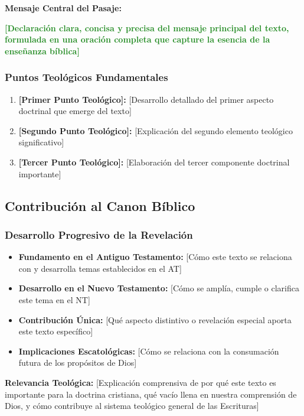 \documentclass[12pt,a4paper]{article}
\newcommand{\principio}[1]{\textcolor{forestgreen}{\textbf{#1}}}
\begin{document}
\begin{mdframed}[style=ImportantBox]
\textbf{Mensaje Central del Pasaje:}

\centering
\Large \principio{[Declaración clara, concisa y precisa del mensaje principal del texto, formulada en una oración completa que capture la esencia de la enseñanza bíblica]}
\end{mdframed}

\subsubsection{Puntos Teológicos Fundamentales}

\begin{enumerate}[leftmargin=*]
    \item \textbf{[Primer Punto Teológico]:} [Desarrollo detallado del primer aspecto doctrinal que emerge del texto]
    \item \textbf{[Segundo Punto Teológico]:} [Explicación del segundo elemento teológico significativo]
    \item \textbf{[Tercer Punto Teológico]:} [Elaboración del tercer componente doctrinal importante]
\end{enumerate}

\subsection{Contribución al Canon Bíblico}

\subsubsection{Desarrollo Progresivo de la Revelación}

\begin{itemize}[leftmargin=*]
    \item \textbf{Fundamento en el Antiguo Testamento:} [Cómo este texto se relaciona con y desarrolla temas establecidos en el AT]
    \item \textbf{Desarrollo en el Nuevo Testamento:} [Cómo se amplía, cumple o clarifica este tema en el NT]
    \item \textbf{Contribución Única:} [Qué aspecto distintivo o revelación especial aporta este texto específico]
    \item \textbf{Implicaciones Escatológicas:} [Cómo se relaciona con la consumación futura de los propósitos de Dios]
\end{itemize}

\begin{mdframed}[style=AlertBox]
\textbf{Relevancia Teológica:}
[Explicación comprensiva de por qué este texto es importante para la doctrina cristiana, qué vacío llena en nuestra comprensión de Dios, y cómo contribuye al sistema teológico general de las Escrituras]
\end{mdframed}
\end{document}
